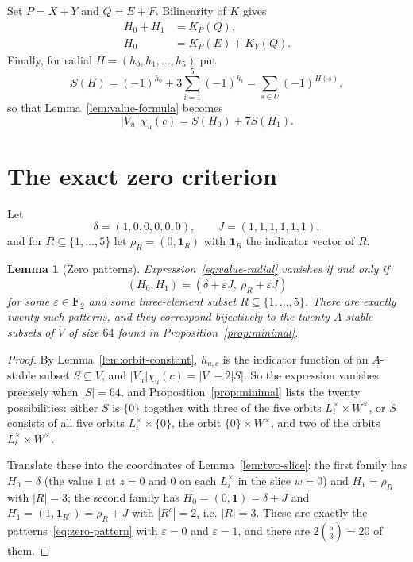 \documentclass[11pt]{article}
\newtheorem{lemma}[theorem]{Lemma}
\theoremstyle{definition}
\theoremstyle{remark}
\newcommand{\F}{\mathbf F}
\newcommand{\one}{\mathbf 1}
\begin{document}
Set $P=X+Y$ and $Q=E+F$.  Bilinearity of $K$ gives
\begin{align}
 H_0+H_1&=K_P(Q),\label{eq:Hsum}\\
 H_0&=K_P(E)+K_Y(Q).\label{eq:H0-reduced}
\end{align}
Finally, for radial $H=(h_0,h_1,\dots,h_5)$ put
\[
 S(H)=(-1)^{h_0}+3\sum_{i=1}^5(-1)^{h_i}
 =\sum_{s\in U}(-1)^{H(s)},
\]
so that Lemma~\ref{lem:value-formula} becomes
\begin{equation}\label{eq:value-radial}
 |V_u|\,\chi_u(c)=S(H_0)+7S(H_1).
\end{equation}

\section{The exact zero criterion}\label{sec:criterion}

Let
\[
 \delta=(1,0,0,0,0,0),\qquad
 J=(1,1,1,1,1,1),
\]
and for $R\subseteq\{1,\dots,5\}$ let $\rho_R=(0,\one_R)$ with
$\one_R$ the indicator vector of $R$.

\begin{lemma}[Zero patterns]\label{lem:zero-patterns}
Expression~\eqref{eq:value-radial} vanishes if and only if
\begin{equation}\label{eq:zero-pattern}
 (H_0,H_1)=(\delta+\varepsilon J,\ \rho_R+\varepsilon J)
\end{equation}
for some $\varepsilon\in\F_2$ and some three-element subset
$R\subseteq\{1,\dots,5\}$.  There are exactly twenty such patterns, and
they correspond bijectively to the twenty $A$-stable subsets of $V$ of
size $64$ found in Proposition~\ref{prop:minimal}.
\end{lemma}

\begin{proof}
By Lemma~\ref{lem:orbit-constant}, $h_{u,c}$ is the indicator function
of an $A$-stable subset $S\subseteq V$, and
$|V_u|\chi_u(c)=|V|-2|S|$.  So the expression vanishes precisely when
$|S|=64$, and Proposition~\ref{prop:minimal} lists the twenty
possibilities: either $S$ is $\{0\}$ together with three of the five
orbits $L_i^\times\times W^\times$, or $S$ consists of all five orbits
$L_i^\times\times\{0\}$, the orbit $\{0\}\times W^\times$, and two of
the orbits $L_i^\times\times W^\times$.

Translate these into the coordinates of Lemma~\ref{lem:two-slice}: the
first family has $H_0=\delta$ (the value $1$ at $z=0$ and $0$ on each
$L_i^\times$ in the slice $w=0$) and $H_1=\rho_R$ with $|R|=3$; the
second family has $H_0=(0,\one)=\delta+J$ and
$H_1=(1,\one_{R^{c}})=\rho_R+J$ with $|R^{c}|=2$, i.e. $|R|=3$.  These
are exactly the patterns~\eqref{eq:zero-pattern} with $\varepsilon=0$
and $\varepsilon=1$, and there are $2\binom53=20$ of them.
\end{proof}
\end{document}
